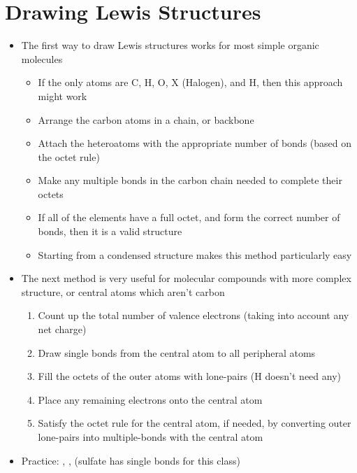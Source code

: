 \documentclass[12pt, openany, letterpaper]{memoir}
\begin{document}
\section{Drawing Lewis Structures}
\begin{itemize}
	\item The first way to draw Lewis structures works for most simple organic molecules
	      \begin{itemize}
		      \item If the only atoms are C, H, O, X (Halogen), and H, then this approach might work
		      \item Arrange the carbon atoms in a chain, or backbone
		      \item Attach the heteroatoms with the appropriate number of bonds (based on the octet rule)
		      \item Make any multiple bonds in the carbon chain needed to complete their octets
		      \item If all of the elements have a full octet, and form the correct number of bonds, then it is a valid structure
		      \item Starting from a condensed structure makes this method particularly easy
	      \end{itemize}
	\item The next method is very useful for molecular compounds with more complex structure, or central atoms which aren't carbon
	      \begin{enumerate}
		      \item Count up the total number of valence electrons (taking into account any net charge)
		      \item Draw single bonds from the central atom to all peripheral atoms
		      \item Fill the octets of the outer atoms with lone-pairs (H doesn't need any)
		      \item Place any remaining electrons onto the central atom
		      \item Satisfy the octet rule for the central atom, if needed, by converting outer lone-pairs into multiple-bonds with the central atom
	      \end{enumerate}
	\item Practice: , ,  (sulfate has single bonds for this class)
\end{itemize}
\end{document}

